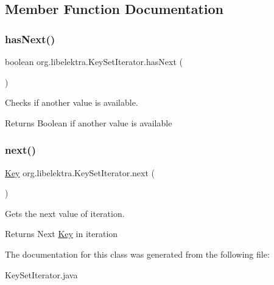 \subsection{Member Function Documentation}
\mbox{\label{classorg_1_1libelektra_1_1KeySetIterator_a5e1ac38d123fdf1613f9a9258ef009a7}} 
\subsubsection{\texorpdfstring{hasNext()}{hasNext()}}
{\footnotesize\ttfamily boolean org.\+libelektra.\+Key\+Set\+Iterator.\+has\+Next (\begin{DoxyParamCaption}{ }\end{DoxyParamCaption})\hspace{0.3cm}{\ttfamily [inline]}}



Checks if another value is available. 

\begin{DoxyReturn}{Returns}
Boolean if another value is available 
\end{DoxyReturn}
\mbox{\label{classorg_1_1libelektra_1_1KeySetIterator_aaa1cd283e898fd4c96ec44faade6effd}} 
\subsubsection{\texorpdfstring{next()}{next()}}
{\footnotesize\ttfamily \mbox{\hyperlink{classorg_1_1libelektra_1_1Key}{Key}} org.\+libelektra.\+Key\+Set\+Iterator.\+next (\begin{DoxyParamCaption}{ }\end{DoxyParamCaption})\hspace{0.3cm}{\ttfamily [inline]}}



Gets the next value of iteration. 

\begin{DoxyReturn}{Returns}
Next \mbox{\hyperlink{classorg_1_1libelektra_1_1Key}{Key}} in iteration 
\end{DoxyReturn}


The documentation for this class was generated from the following file\+:\begin{DoxyCompactItemize}
\item 
Key\+Set\+Iterator.\+java\end{DoxyCompactItemize}
